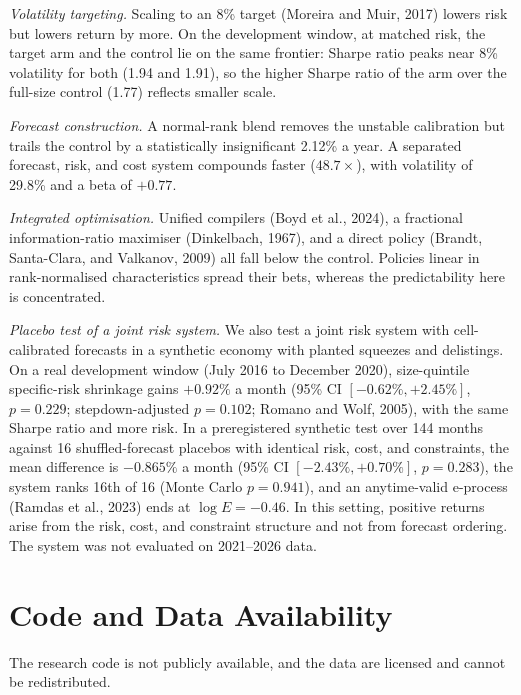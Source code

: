 \documentclass[10pt,twocolumn,letterpaper]{article}
\begin{document}
\textit{Volatility targeting.} Scaling to an 8\% target (Moreira and Muir, 2017) lowers risk but lowers return by more. On the development window, at matched risk, the target arm and the control lie on the same frontier: Sharpe ratio peaks near 8\% volatility for both (1.94 and 1.91), so the higher Sharpe ratio of the arm over the full-size control (1.77) reflects smaller scale.

\textit{Forecast construction.} A normal-rank blend removes the unstable calibration but trails the control by a statistically insignificant 2.12\% a year. A separated forecast, risk, and cost system compounds faster ($48.7\times$), with volatility of 29.8\% and a beta of $+0.77$.

\textit{Integrated optimisation.} Unified compilers (Boyd et al., 2024), a fractional information-ratio maximiser (Dinkelbach, 1967), and a direct policy (Brandt, Santa-Clara, and Valkanov, 2009) all fall below the control. Policies linear in rank-normalised characteristics spread their bets, whereas the predictability here is concentrated.

\textit{Placebo test of a joint risk system.} We also test a joint risk system with cell-calibrated forecasts in a synthetic economy with planted squeezes and delistings. On a real development window (July 2016 to December 2020), size-quintile specific-risk shrinkage gains $+0.92\%$ a month (95\% CI $[-0.62\%, +2.45\%]$, $p = 0.229$; stepdown-adjusted $p = 0.102$; Romano and Wolf, 2005), with the same Sharpe ratio and more risk. In a preregistered synthetic test over 144 months against 16 shuffled-forecast placebos with identical risk, cost, and constraints, the mean difference is $-0.865\%$ a month (95\% CI $[-2.43\%, +0.70\%]$, $p = 0.283$), the system ranks 16th of 16 (Monte Carlo $p = 0.941$), and an anytime-valid e-process (Ramdas et al., 2023) ends at $\log E = -0.46$. In this setting, positive returns arise from the risk, cost, and constraint structure and not from forecast ordering. The system was not evaluated on 2021--2026 data.

\section*{Code and Data Availability}

The research code is not publicly available, and the data are licensed and cannot be redistributed.

\vspace{3pt}
\end{document}
